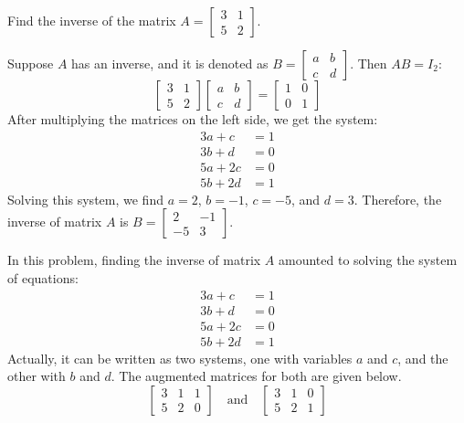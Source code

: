 \begin{example}\label{calculate_2x2_inverse}
    Find the inverse of the matrix \( A = \begin{bmatrix} 3 & 1 \\ 5 & 2 \end{bmatrix} \).
\end{example}
\begin{solution}
    Suppose \( A \) has an inverse, and it is denoted as \( B = \begin{bmatrix} a & b \\ c & d \end{bmatrix} \).
    Then \( AB = I_2 \):
    \[ \begin{bmatrix} 3 & 1 \\ 5 & 2 \end{bmatrix} \begin{bmatrix} a & b \\ c & d \end{bmatrix} = \begin{bmatrix} 1 & 0 \\ 0 & 1 \end{bmatrix} \]
    After multiplying the matrices on the left side, we get the system:
    \[
        \begin{aligned}
            3a + c  & = 1 \\
            3b + d  & = 0 \\
            5a + 2c & = 0 \\
            5b + 2d & = 1
        \end{aligned}
    \]
    Solving this system, we find \( a = 2 \), \( b = -1 \), \( c = -5 \), and \( d = 3 \). Therefore, the inverse of matrix \( A \) is \( B = \begin{bmatrix} 2 & -1 \\ -5 & 3 \end{bmatrix} \).
\end{solution}

In this problem, finding the inverse of matrix \( A \) amounted to solving the system of equations:
\[
    \begin{aligned}
        3a + c  & = 1 \\
        3b + d  & = 0 \\
        5a + 2c & = 0 \\
        5b + 2d & = 1
    \end{aligned}
\]
Actually, it can be written as two systems, one with variables \( a \) and \( c \), and the other with \( b \) and \( d \). The augmented matrices for both are given below.
\[
    \left[
        \begin{array}{cc|c}
            3 & 1 & 1 \\
            5 & 2 & 0
        \end{array}
        \right]
    \quad \text{and} \quad
    \left[
        \begin{array}{cc|c}
            3 & 1 & 0 \\
            5 & 2 & 1
        \end{array}
        \right]
\]

